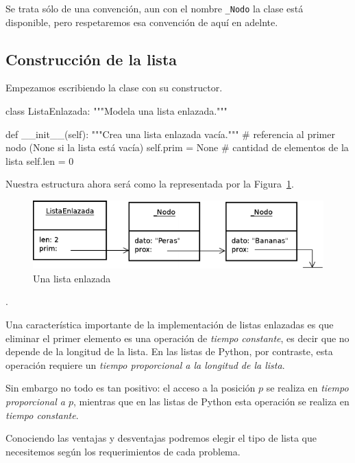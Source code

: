 \begin{observacion}
Se trata sólo de una convención, aun con el nombre \lstinline!_Nodo! la
clase está disponible, pero respetaremos esa convención de aquí en adelnte.
\end{observacion}

\subsection{Construcción de la lista}

Empezamos escribiendo la clase con su constructor.

\begin{codigo-python-sn}
class ListaEnlazada:
    """Modela una lista enlazada."""

    def __init__(self):
        """Crea una lista enlazada vacía."""
        # referencia al primer nodo (None si la lista está vacía)
        self.prim = None
        # cantidad de elementos de la lista
        self.len = 0
\end{codigo-python-sn}

Nuestra estructura ahora será como la representada por la Figura~\ref{lista_enlazada}.

\begin{figure}[htb]
\includegraphics{graficos/16_ListaEnlazada}
\caption{Una lista enlazada}
\label{lista_enlazada}
\end{figure}

.

\begin{sabias_que}
Una característica importante de la implementación de listas enlazadas es que
eliminar el primer elemento es una operación de \emph{tiempo constante}, es
decir que no depende de la longitud de la lista. En las listas de
Python, por contraste, esta operación requiere un \emph{tiempo proporcional a la
longitud de la lista}.

Sin embargo no todo es tan positivo: el acceso a la posición $p$ se realiza
en \emph{tiempo proporcional a $p$}, mientras que en las listas de Python esta
operación se realiza en \emph{tiempo constante}.

Conociendo las ventajas y desventajas podremos elegir el tipo de lista que
necesitemos según los requerimientos de cada problema.
\end{sabias_que}

